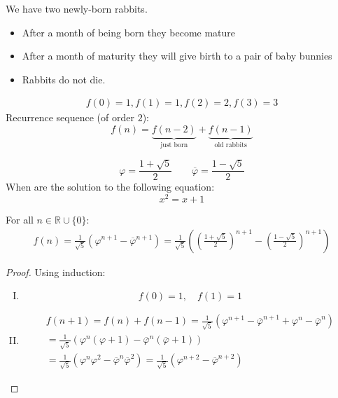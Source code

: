 \documentclass[00_complete]{subfiles}
\begin{document}
\begin{example}
    We have two newly-born rabbits.
\begin{itemize}
    \item After a month of being born they become mature
        \item After a month of maturity they will give birth to a pair of baby
            bunnies
        \item Rabbits do not die.
\end{itemize}
$$
\begin{gathered}
    f(0)=1, f(1)=1, f(2)=2, f(3)=3
\end{gathered}
$$
Recurrence sequence (of order $2$):
$$f(n)=\underbrace{f(n-2)}_{\text{just born}}+\underbrace{f(n-1)}_{\text{old
rabbits}}$$
\begin{symbols}
    $$\varphi = \frac{1+\sqrt 5}{2} \qquad \overline \varphi = \frac{ 1- \sqrt 5}{2}$$
    When are the solution to the following equation:
    $$x^2=x+1$$
\end{symbols}
\begin{claim}
    For all $n \in \mathbb{R}\cup\{0\}$:
    $$
    \begin{gathered}
        f(n)=\frac{1}{\sqrt 5}\left(\varphi^{n+1}-\overline \varphi^{n+1}\right)
        =\frac{1}{\sqrt 5}\left(\left(\frac{1+\sqrt 5}{2}\right)^{n+1}-\left(\frac{1-\sqrt 5}{2}\right)^{n+1}\right)
    \end{gathered}
    $$
\end{claim}
\begin{proof}
    Using induction:
    \begin{enumerate}[I.]
        \item \begin{equation}
            f(0)=1, \quad f(1)=1
            \tag{\checkmark}
        \end{equation}
        \item
        \begin{gather*}
            f(n+1)=f(n)+f(n-1)=\frac{1}{\sqrt 5}(\varphi^{n+1}-\overline
            \varphi^{n+1}+\varphi^n-\overline \varphi^n) \\
            = \frac{1}{\sqrt 5} (\varphi^n(\varphi+1)-\overline
            \varphi^n(\overline \varphi +1)) \\
            =\frac{1}{\sqrt 5}(\varphi^n\varphi^2-\overline \varphi^n \overline
            \varphi^2) = \frac{1}{\sqrt 5}(\varphi^{n+2}-\overline \varphi^{n+2})
            \tag{\checkmark}
        \end{gather*}
    \end{enumerate}
\end{proof}
\end{example}
\end{document}
